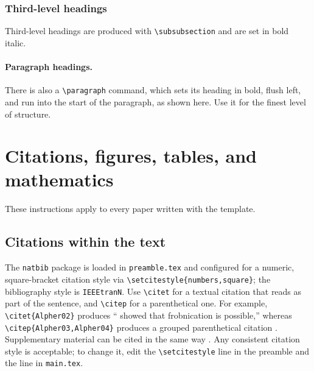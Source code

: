 \subsubsection{Third-level headings}
\label{sec:third}

Third-level headings are produced with \verb+\subsubsection+ and are set in bold
italic.

\paragraph{Paragraph headings.}
There is also a \verb+\paragraph+ command, which sets its heading in bold, flush
left, and run into the start of the paragraph, as shown here. Use it for the
finest level of structure.




\section{Citations, figures, tables, and mathematics}
\label{sec:others}

These instructions apply to every paper written with the template.

\subsection{Citations within the text}
\label{sec:citations}

The \verb+natbib+ package is loaded in \verb+preamble.tex+ and configured for a
numeric, square-bracket citation style via \verb+\setcitestyle{numbers,square}+; the
bibliography style is \verb+IEEEtranN+. Use \verb+\citet+ for a textual citation
that reads as part of the sentence, and \verb+\citep+ for a parenthetical one.
For example, \verb+\citet{Alpher02}+ produces ``\citet{Alpher02} showed that
frobnication is possible,'' whereas \verb+\citep{Alpher03,Alpher04}+ produces a
grouped parenthetical citation \citep{Alpher03,Alpher04}. Supplementary material
can be cited in the same way \citep{Authors14}. Any consistent citation style is
acceptable; to change it, edit the \verb+\setcitestyle+ line in the preamble and
the \verb++ line in \verb+main.tex+.

